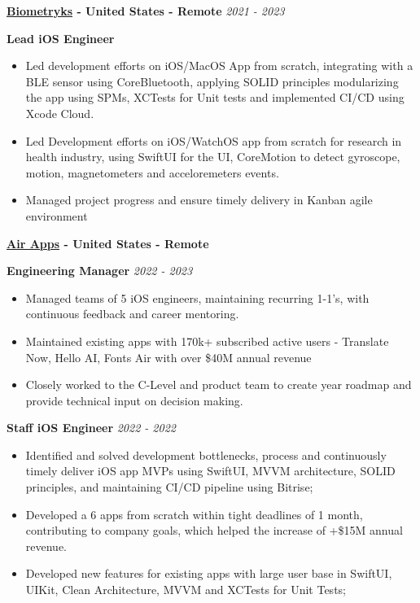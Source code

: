 \documentclass[11pt, oneside]{article}
\begin{document}
\textbf{\href{https://www.biometryks.com}{Biometryks} - United States - Remote}
\hfill
\textit{2021 - 2023}

\textbf{Lead iOS Engineer}

\begin{itemize}
    \item Led development efforts on iOS/MacOS App from scratch, integrating with a BLE sensor using CoreBluetooth, applying SOLID principles modularizing the app using SPMs, XCTests for Unit tests and implemented CI/CD using Xcode Cloud.
    \item Led Development efforts on iOS/WatchOS app from scratch for research in health industry, using SwiftUI for the UI, CoreMotion to detect gyroscope, motion, magnetometers and acceloremeters events.
    \item Managed project progress and ensure timely delivery in Kanban agile environment
\end{itemize}

\textbf{\href{https://airapps.co}{Air Apps} - United States - Remote}

\textbf{Engineering Manager}
\hfill
\textit{2022 - 2023}

\begin{itemize}
    \item Managed teams of 5 iOS engineers, maintaining recurring 1-1’s, with continuous feedback and career mentoring. 
    \item Maintained existing apps with 170k+ subscribed active users - Translate Now, Hello AI, Fonts Air with over \$40M annual revenue
    \item Closely worked to the C-Level and product team to create year roadmap and provide technical input on decision making.
\end{itemize}

\textbf{Staff iOS Engineer}
\hfill
\textit{2022 - 2022}

\begin{itemize}
    \item Identified and solved development bottlenecks, process and continuously timely deliver iOS app MVPs using SwiftUI, MVVM architecture, SOLID principles, and maintaining CI/CD pipeline using Bitrise;
    \item Developed a 6 apps from scratch within tight deadlines of 1 month, contributing to company goals, which helped the increase of +\$15M annual revenue.
    \item Developed new features for existing apps with large user base in SwiftUI, UIKit, Clean Architecture, MVVM and XCTests for Unit Tests;
\end{itemize}
\end{document}
